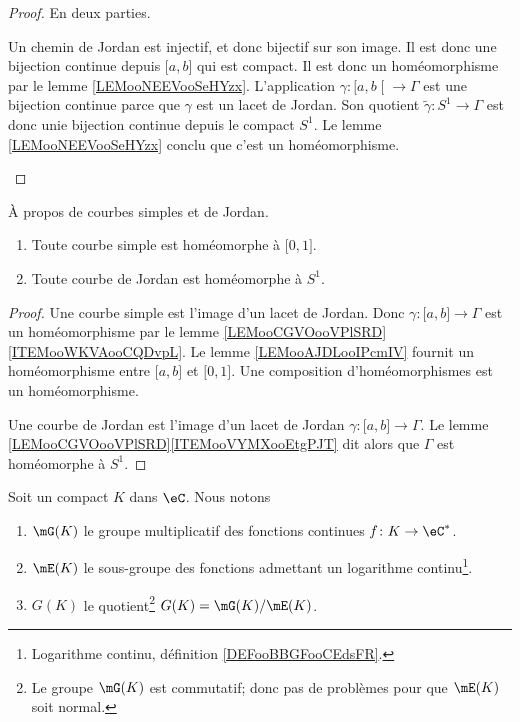 \begin{proof}
	En deux parties.
	\begin{subproof}
		Un chemin de Jordan est injectif, et donc bijectif sur son image. Il est donc une bijection continue depuis \( \mathopen[ a , b \mathclose]\) qui est compact. Il est donc un homéomorphisme par le lemme \ref{LEMooNEEVooSeHYzx}.
		L'application \( \gamma\colon \mathopen[ a , b \mathclose[\to \Gamma \) est une bijection continue parce que \( \gamma\) est un lacet de Jordan. Son quotient \( \tilde \gamma\colon S^1\to \Gamma\) est donc unie bijection continue depuis le compact \( S^1\). Le lemme \ref{LEMooNEEVooSeHYzx} conclu que c'est un homéomorphisme.
	\end{subproof}
\end{proof}

\begin{corollary}
	À propos de courbes simples et de Jordan.
	\begin{enumerate}
		\item
		      Toute courbe simple est homéomorphe à \( \mathopen[ 0 , 1 \mathclose]\).
		\item
		      Toute courbe de Jordan est homéomorphe à \( S^1\).
	\end{enumerate}
\end{corollary}

\begin{proof}
	Une courbe simple est l'image d'un lacet de Jordan. Donc \( \gamma\colon \mathopen[ a , b \mathclose]\to \Gamma\) est un homéomorphisme par le lemme \ref{LEMooCGVOooVPlSRD}\ref{ITEMooWKVAooCQDvpL}. Le lemme \ref{LEMooAJDLooIPcmIV} fournit un homéomorphisme entre \( \mathopen[ a , b \mathclose]\) et \( \mathopen[ 0 , 1 \mathclose]\). Une composition d'homéomorphismes est un homéomorphisme.

	Une courbe de Jordan est l'image d'un lacet de Jordan \( \gamma\colon \mathopen[ a , b \mathclose]\to \Gamma\). Le lemme \ref{LEMooCGVOooVPlSRD}\ref{ITEMooVYMXooEtgPJT} dit alors que \( \Gamma\) est homéomorphe à \( S^1\).
\end{proof}


\begin{definition}        \label{DEFooURFMooXIaRkl}
	Soit un compact \( K\) dans \( \eC\). Nous notons
	\begin{enumerate}
		\item
		      \( \mG(K)\) le groupe multiplicatif des fonctions continues \( f\colon K\to \eC^*\).
		\item
		      \( \mE(K)\) le sous-groupe des fonctions admettant un logarithme continu\footnote{Logarithme continu, définition \ref{DEFooBBGFooCEdsFR}.}.
		\item
		      \( G(K)\) le quotient\footnote{Le groupe \( \mG(K)\) est commutatif; donc pas de problèmes pour que \( \mE(K)\) soit normal.} \( G(K)=\mG(K)/\mE(K)\).
	\end{enumerate}
\end{definition}

